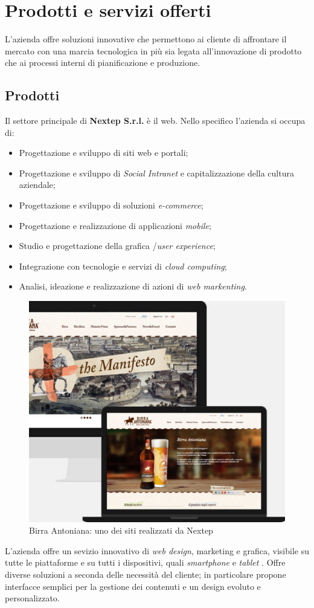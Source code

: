 \section{Prodotti e servizi offerti}

L'azienda offre soluzioni innovative che permettono ai cliente di affrontare il mercato con una marcia tecnologica in più sia legata all'innovazione di prodotto che ai processi interni di pianificazione e produzione.

\subsection{Prodotti}

Il settore principale di \textbf{Nextep S.r.l. }è il web. Nello specifico l'azienda si occupa di:
\begin{itemize}
	\item Progettazione e sviluppo di siti web e portali;
	\item Progettazione e sviluppo di \textit{Social Intranet }e capitalizzazione della cultura aziendale;
	\item Progettazione e sviluppo di soluzioni \textit{e-commerce};
	\item Progettazione e realizzazione di applicazioni \textit{mobile};
	\item Studio e progettazione della grafica /\textit{user experience};
	\item Integrazione con tecnologie e servizi di \textit{cloud computing};
	\item Analisi, ideazione e realizzazione di azioni di \textit{web markenting}.
\end{itemize}

\begin{figure}[h]
\centering
\includegraphics[width=0.5\linewidth]{immagini/sito}
\caption[Birra Antoniana: uno dei siti realizzati da Nextep]{Birra Antoniana: uno dei siti realizzati da Nextep}
\label{fig:sito}
\end{figure}
L'azienda offre un sevizio innovativo di \textit{web design}, marketing e grafica, visibile su tutte le piattaforme e su tutti i dispositivi, quali \textit{smartphone} e \textit{tablet} . Offre diverse soluzioni a seconda delle necessità del cliente; in particolare propone interfacce semplici per la gestione dei contenuti e un design evoluto e personalizzato.


